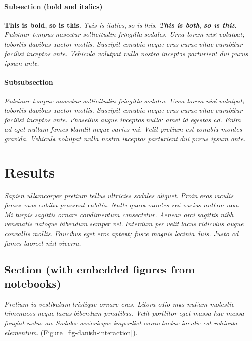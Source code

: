 \documentclass[
  a4paper,
]{scrbook}
\let\oldemph\emph
\renewcommand\emph[1]{\oldemph{\color{gray}#1}}
\begin{document}
\subsubsection{Subsection (bold and
italics)}\label{subsection-bold-and-italics}

\textbf{This is bold}, \textbf{so is this}. \emph{This is italics},
\emph{so is this}. \textbf{\emph{This is both}}, \textbf{\emph{so is
this}}. \emph{Pulvinar tempus nascetur sollicitudin fringilla sodales.
Urna lorem nisi volutpat; lobortis dapibus auctor mollis. Suscipit
conubia neque cras curae vitae curabitur facilisi inceptos ante.
Vehicula volutpat nulla nostra inceptos parturient dui purus ipsum
ante.}

\subsubsection{Subsubsection}\label{subsubsection}

\emph{Pulvinar tempus nascetur sollicitudin fringilla sodales. Urna
lorem nisi volutpat; lobortis dapibus auctor mollis. Suscipit conubia
neque cras curae vitae curabitur facilisi inceptos ante. Phasellus augue
inceptos nulla; amet id egestas ad. Enim ad eget nullam fames blandit
neque varius mi. Velit pretium est conubia montes gravida. Vehicula
volutpat nulla nostra inceptos parturient dui purus ipsum ante.}

\chapter{Results}\label{results}

\emph{Sapien ullamcorper pretium tellus ultricies sodales aliquet. Proin
eros iaculis fames mus cubilia praesent cubilia. Nulla quam montes sed
varius nullam non. Mi turpis sagittis ornare condimentum consectetur.
Aenean orci sagittis nibh venenatis natoque bibendum semper vel.
Interdum per velit lacus ridiculus augue convallis mollis. Faucibus eget
eros aptent; fusce magnis lacinia duis. Justo ad fames laoreet nisl
viverra.}

\section{Section (with embedded figures from
notebooks)}\label{section-with-embedded-figures-from-notebooks}

\emph{Pretium id vestibulum tristique ornare cras. Litora odio mus
nullam molestie himenaeos neque lacus bibendum penatibus. Velit
porttitor eget massa hac massa feugiat netus ac. Sodales scelerisque
imperdiet curae luctus iaculis est vehicula elementum.}
(Figure~\ref{fig-danish-interaction}).
\end{document}
